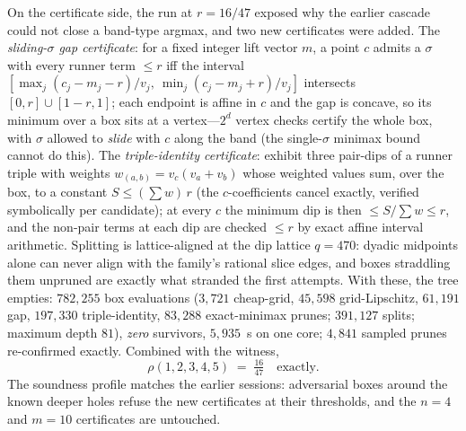 On the certificate side, the run at $r=16/47$ exposed why the earlier
cascade could not close a band-type argmax, and two new certificates
were added. The \emph{sliding-$\sigma$ gap certificate}: for a fixed
integer lift vector $m$, a point $c$ admits a $\sigma$ with every
runner term $\le r$ iff the interval
$[\max_j (c_j-m_j-r)/v_j,\ \min_j (c_j-m_j+r)/v_j]$ intersects
$[0,r]\cup[1-r,1]$; each endpoint is affine in $c$ and the gap is
concave, so its minimum over a box sits at a vertex---$2^d$ vertex
checks certify the whole box, with $\sigma$ allowed to \emph{slide}
with $c$ along the band (the single-$\sigma$ minimax bound cannot do
this). The \emph{triple-identity certificate}: exhibit three pair-dips
of a runner triple with weights $w_{(a,b)}=v_c(v_a{+}v_b)$ whose
weighted values sum, over the box, to a constant $S\le(\sum w)\,r$
(the $c$-coefficients cancel exactly, verified symbolically per
candidate); at every $c$ the minimum dip is then $\le S/\sum w\le
r$, and the non-pair terms at each dip are checked $\le r$ by exact
affine interval arithmetic. Splitting is lattice-aligned at the dip
lattice $q=470$: dyadic midpoints alone can never align with the
family's rational slice edges, and boxes straddling them unpruned are
exactly what stranded the first attempts. With these, the tree empties:
$782{,}255$ box evaluations ($3{,}721$ cheap-grid, $45{,}598$
grid-Lipschitz, $61{,}191$ gap, $197{,}330$ triple-identity,
$83{,}288$ exact-minimax prunes; $391{,}127$ splits; maximum depth
$81$), \emph{zero} survivors, $5{,}935$~s on one core; $4{,}841$
sampled prunes re-confirmed exactly. Combined with the witness,
\[
\rho(1,2,3,4,5)\;=\;\tfrac{16}{47}\quad\text{exactly.}
\]
The soundness profile matches the earlier sessions: adversarial boxes
around the known deeper holes refuse the new certificates at their
thresholds, and the $n=4$ and $m=10$ certificates are untouched.

